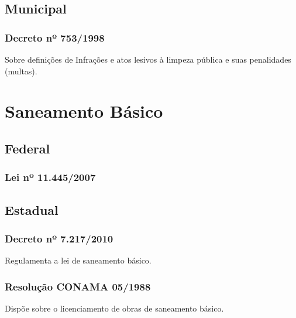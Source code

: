 \begin{subapend}
	\subsection{Municipal}
	\begin{subsubapend}
	\item \subsubsection{Decreto nº 753/1998}
	Sobre definições de Infrações e atos lesivos à limpeza pública e suas penalidades (multas).
	\end{subsubapend}
\end{subapend}

\section{Saneamento Básico}

\begin{subapend}
	\subsection{Federal}
	\begin{subsubapend}
		\item \subsubsection{Lei nº 11.445/2007}
	\end{subsubapend}
\end{subapend}

\begin{subapend}
	\subsection{Estadual}
	\begin{subsubapend}
		\item \subsubsection{Decreto nº 7.217/2010}
		Regulamenta a lei de saneamento básico.
		\subsubsection{Resolução CONAMA 05/1988}
		Dispõe sobre o licenciamento de obras de saneamento básico.
	\end{subsubapend}
\end{subapend}
